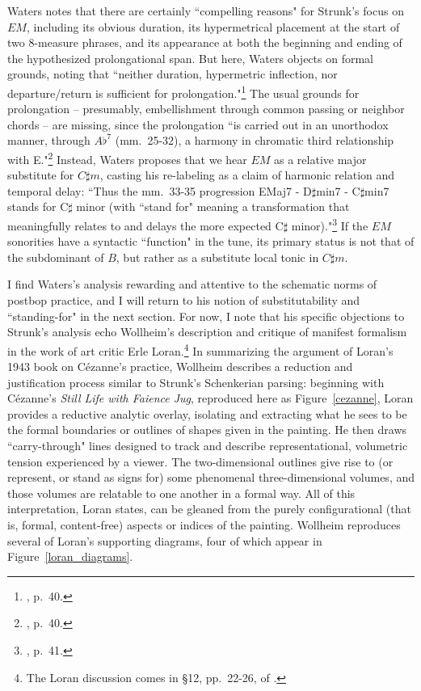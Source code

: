 Waters notes that there are certainly ``compelling reasons" for Strunk's focus on $EM$, including its obvious duration, its hypermetrical placement at the start of two 8-measure phrases, and its appearance at both the beginning and ending of the hypothesized prolongational span.  But here, Waters objects on formal grounds, noting that ``neither duration, hypermetric inflection, nor departure/return is sufficient for prolongation."\footnote{\cite{waters2016}, p.\ 40.}  The usual grounds for prolongation -- presumably, embellishment through common passing or neighbor chords -- are missing, since the prolongation ``is carried out in an unorthodox manner, through $A\flat^7$ (mm.\ 25-32), a harmony in chromatic third relationship with E."\footnote{\cite{waters2016}, p.\ 40.}  Instead, Waters proposes that we hear $EM$ as a relative major substitute for $C\sharp m$, casting his re-labeling as a claim of harmonic relation and temporal delay: ``Thus the mm.\ 33-35 progression EMaj7 - D$\sharp$min7 - C$\sharp$min7 stands for C$\sharp$ minor (with ``stand for" meaning a transformation that meaningfully relates to and delays the more expected C$\sharp$ minor)."\footnote{\cite{waters2016}, p.\ 41.}  If the $EM$ sonorities have a syntactic ``function" in the tune, its primary status is not that of the subdominant of $B$, but rather as a substitute local tonic in $C\sharp m$.

I find Waters's analysis rewarding and attentive to the schematic norms of postbop practice, and I will return to his notion of substitutability and ``standing-for" in the next section.  For now, I note that his specific objections to Strunk's analysis echo Wollheim's description and critique of manifest formalism in the work of art critic Erle Loran.\footnote{The Loran discussion comes in \S 12, pp.\ 22-26, of \cite{wollheim1995}.}  In summarizing the argument of Loran's 1943 book on C\'{e}zanne's practice, Wollheim describes a reduction and justification process similar to Strunk's Schenkerian parsing: beginning with C\'{e}zanne's \emph{Still Life with Faience Jug}, reproduced here as Figure~\ref{cezanne}, Loran provides a reductive analytic overlay, isolating and extracting what he sees to be the formal boundaries or outlines of shapes given in the painting.  He then draws ``carry-through" lines designed to track and describe representational, volumetric tension experienced by a viewer.  The two-dimensional outlines give rise to (or represent, or stand as signs for) some phenomenal three-dimensional volumes, and those volumes are relatable to one another in a formal way.  All of this interpretation, Loran states, can be gleaned from the purely configurational (that is, formal, content-free) aspects or indices of the painting.  Wollheim reproduces several of Loran's supporting diagrams, four of which appear in Figure~\ref{loran_diagrams}.

